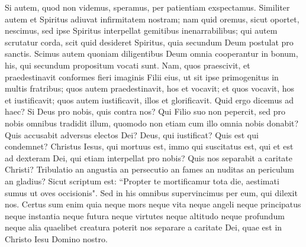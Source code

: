 \begin{biblechapter}
\verse Si autem, quod non videmus, speramus, per patientiam exspectamus. 
\verse Similiter autem et Spiritus adiuvat infirmitatem nostram; nam quid oremus, sicut oportet, nescimus, sed ipse Spiritus interpellat gemitibus inenarrabilibus; 
\verse qui autem scrutatur corda, scit quid desideret Spiritus, quia secundum Deum postulat pro sanctis. 
\verse Scimus autem quoniam diligentibus Deum omnia cooperantur in bonum, his, qui secundum propositum vocati sunt. 
\verse Nam, quos praescivit, et praedestinavit conformes fieri imaginis Filii eius, ut sit ipse primogenitus in multis fratribus; 
\verse quos autem praedestinavit, hos et vocavit; et quos vocavit, hos et iustificavit; quos autem iustificavit, illos et glorificavit. 
\verse Quid ergo dicemus ad haec? Si Deus pro nobis, quis contra nos? 
\verse Qui Filio suo non pepercit, sed pro nobis omnibus tradidit illum, quomodo non etiam cum illo omnia nobis donabit? 
\verse Quis accusabit adversus electos Dei? Deus, qui iustificat? 
\verse Quis est qui condemnet? Christus Iesus, qui mortuus est, immo qui suscitatus est, qui et est ad dexteram Dei, qui etiam interpellat pro nobis? 
\verse Quis nos separabit a caritate Christi? Tribulatio an angustia an persecutio an fames an nuditas an periculum an gladius? 
\verse Sicut scriptum est: “Propter te mortificamur tota die, aestimati sumus ut oves occisionis". 
\verse Sed in his omnibus supervincimus per eum, qui dilexit nos. 
\verse Certus sum enim quia neque mors neque vita neque angeli neque principatus neque instantia neque futura neque virtutes 
\verse neque altitudo neque profundum neque alia quaelibet creatura poterit nos separare a caritate Dei, quae est in Christo Iesu Domino nostro. 
\end{biblechapter}

